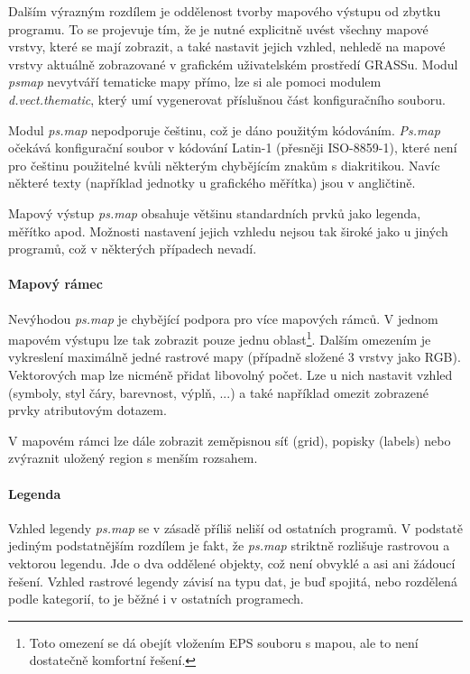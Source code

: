 \documentclass[a4paper,12pt,draft]{article}
\newcommand{\modul}[1]{\emph{#1}}
\begin{document}
Dalším výrazným rozdílem je oddělenost tvorby mapového výstupu od
zbytku programu. To se projevuje tím, že je nutné explicitně uvést
všechny mapové vrstvy, které se mají zobrazit, a také nastavit jejich
vzhled, nehledě na mapové vrstvy aktuálně zobrazované  v grafickém
uživatelském prostředí GRASSu. Modul \modul{psmap} nevytváří
tematicke mapy přímo, lze si ale pomoci modulem \emph{d.vect.thematic},
který umí vygenerovat příslušnou část konfiguračního souboru.

Modul \modul{ps.map} nepodporuje češtinu, což je dáno použitým
kódováním. \modul{Ps.map} očekává konfigurační soubor v kódování
Latin-1 (přesněji ISO-8859-1), které není pro češtinu použitelné
kvůli některým chybějícím znakům s diakritikou. Navíc některé texty
(například jednotky u grafického měřítka) jsou v angličtině.

Mapový výstup \modul{ps.map} obsahuje většinu standardních prvků jako
legenda, měřítko apod. Možnosti nastavení jejich vzhledu nejsou tak
široké jako u jiných programů, což v některých případech nevadí.

\paragraph*{Mapový rámec}
Nevýhodou \modul{ps.map} je chybějící podpora pro více mapových
rámců. V jednom mapovém výstupu lze tak zobrazit pouze jednu
oblast\footnote{Toto omezení se dá obejít vložením EPS souboru s mapou,
ale to není dostatečně komfortní řešení.}. Dalším omezením je
vykreslení maximálně jedné rastrové mapy (případně složené 3 vrstvy
jako RGB). Vektorových map lze nicméně přidat libovolný počet. Lze u
nich nastavit vzhled (symboly, styl čáry, barevnost, výplň, ...) a také
například omezit zobrazené prvky atributovým dotazem.

V mapovém rámci lze dále zobrazit zeměpisnou síť (grid), popisky
(labels) nebo zvýraznit uložený region s menším rozsahem.

\paragraph*{Legenda}
Vzhled legendy \modul{ps.map} se v zásadě příliš neliší od ostatních
programů. V podstatě jediným podstatnějším rozdílem je fakt, že
\modul{ps.map} striktně rozlišuje rastrovou a vektorou legendu. Jde o dva
oddělené objekty, což není obvyklé a asi ani žádoucí řešení. Vzhled
rastrové legendy závisí na typu dat, je buď spojitá, nebo rozdělená
podle kategorií, to je běžné i v ostatních programech.
\end{document}
